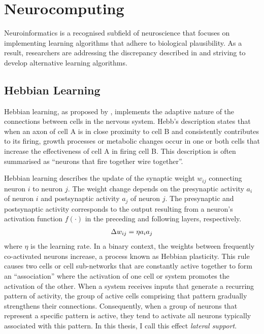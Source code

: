 \section{Neurocomputing}
Neuroinformatics is a recognised subfield of neuroscience that focuses on implementing learning algorithms that adhere to biological plausibility. As a result, researchers are addressing the discrepancy described in  and striving to develop alternative learning algorithms.

\subsection{Hebbian Learning}
Hebbian learning, as proposed by , implements the adaptive nature of the connections between cells in the nervous system. Hebb's description states that when an axon of cell A is in close proximity to cell B and consistently contributes to its firing, growth processes or metabolic changes occur in one or both cells that increase the effectiveness of cell A in firing cell B. This description is often summarised as ``neurons that fire together wire together''.

Hebbian learning describes the update of the synaptic weight $w_{ij}$ connecting neuron $i$ to neuron $j$. The weight change depends on the presynaptic activity $a_i$ of neuron $i$ and postsynaptic activity $a_j$ of neuron $j$. The presynaptic and postsynaptic activity corresponds to the output resulting from a neuron's activation function $f(\cdot)$ in the preceding and following layers, respectively.
%
\begin{align}\eqlbl{hebb_1}
	\Delta w_{ij} = \eta a_i a_j
\end{align}
%
where \(\eta\) is the learning rate.
In a binary context, the weights between frequently co-activated neurons increase, a process known as Hebbian plasticity.
This rule causes two cells or cell sub-networks that are constantly active together to form an ``association'' where the activation of one cell or system promotes the activation of the other.
When a system receives inputs that generate a recurring pattern of activity, the group of active cells comprising that pattern gradually strengthens their connections. Consequently, when a group of neurons that represent a specific pattern is active, they tend to activate all neurons typically associated with this pattern. In this thesis, I call this effect \emph{lateral support}.

